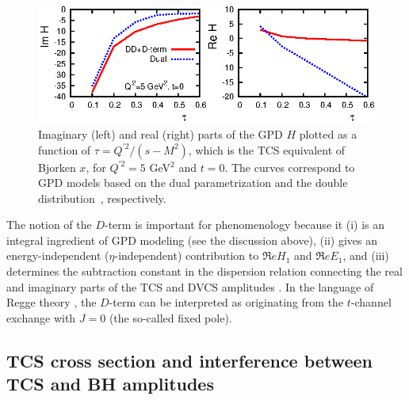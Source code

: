 \begin{figure}[t]
\begin{center}
\includegraphics[scale=1.5]{comp_DD_Dual_Q2_5.eps}
\end{center}
\caption{\small{Imaginary (left) and real (right) parts of the GPD $H$
plotted as a function of $\tau = Q^{\prime 2} / (s - M^2)$, which is the
TCS equivalent of Bjorken $x$, for $Q^{\prime 2} = 5$ GeV$^2$ and $t = 0$.
The curves correspond to GPD models based on the dual parametrization
\cite{Polyakov:2002wz,Guzey:2006xi,Guzey:2008ys,Polyakov:2008aa} and the
double distribution~\cite{Radyushkin:1998es}, respectively.}}
\label{fig:ReImH_tau}
\end{figure}

The notion of the $D$-term is
important for phenomenology because it
(i) is an integral ingredient of GPD modeling (see the discussion above),
(ii) gives an energy-independent ($\eta$-independent) contribution to
$\Re e H_1$ and $\Re e E_1$, and 
(iii) determines the subtraction constant in the dispersion relation
connecting the real and imaginary parts of the TCS and DVCS amplitudes
\cite{Radyushkin:2011dh,Anikin:2007yh,Diehl:2007jb,Polyakov:2007rv}.
In the language of Regge theory
\cite{Brodsky:1971zh,Brodsky:1972vv,Brodsky:1973hm,Brodsky:2008qu},
the $D$-term can be interpreted as originating from the $t$-channel
exchange with $J=0$ (the so-called fixed pole).


\subsection{TCS cross section and interference between TCS and BH amplitudes}
\label{subsec:observables}

